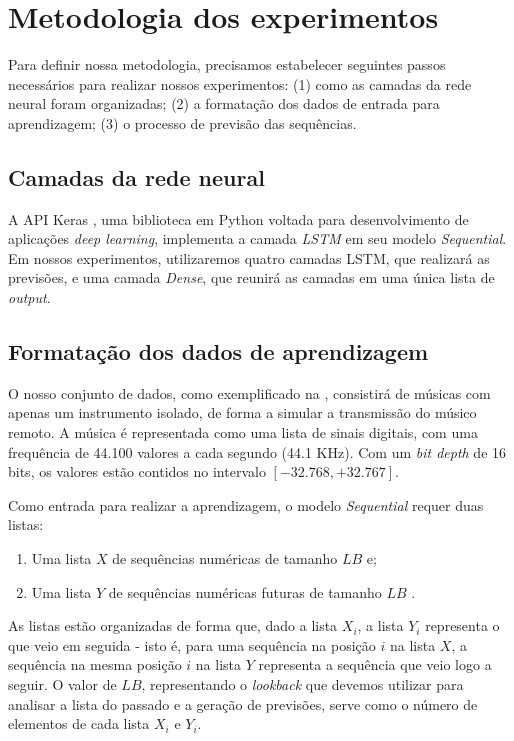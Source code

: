 \section{Metodologia dos experimentos}
\label{sec:lstm-metodology}

Para definir nossa metodologia, precisamos estabelecer seguintes passos necessários para realizar nossos experimentos: (1) como as camadas da rede neural foram organizadas; (2) a formatação dos dados de entrada para aprendizagem; (3) o processo de previsão das sequências.

\subsection{Camadas da rede neural}

A API Keras \cite{keras}, uma biblioteca em Python voltada para desenvolvimento de aplicações \textit{deep learning}, implementa a camada \textit{LSTM} em seu modelo \textit{Sequential}. Em nossos experimentos, utilizaremos quatro camadas LSTM, que realizará as previsões, e uma camada \textit{Dense}, que reunirá as camadas em uma única lista de \textit{output}.

\subsection{Formatação dos dados de aprendizagem}
\label{subsec:input_lstm}

O nosso conjunto de dados, como exemplificado na , consistirá de músicas com apenas um instrumento isolado, de forma a simular a transmissão do músico remoto. A música é representada como uma lista de sinais digitais, com uma frequência de 44.100 valores a cada segundo (44.1 KHz). Com um \textit{bit depth} de 16 bits, os valores estão contidos no intervalo $[-32.768, +32.767]$.

Como entrada para realizar a aprendizagem, o modelo \textit{Sequential} requer duas listas:

\begin{enumerate}
    \item Uma lista $X$ de sequências numéricas de tamanho $LB$ e;
    \item Uma lista $Y$ de sequências numéricas futuras de tamanho $LB$ .
\end{enumerate}

As listas estão organizadas de forma que, dado a lista $X_i$, a lista $Y_i$ representa o que veio em seguida - isto é, para uma sequência na posição $i$ na lista $X$, a sequência na mesma posição $i$ na lista $Y$ representa a sequência que veio logo a seguir. O valor de $LB$, representando o \textit{lookback} que devemos utilizar para analisar a lista do passado e a geração de previsões, serve como o número de elementos de cada lista $X_i$ e $Y_i$.

